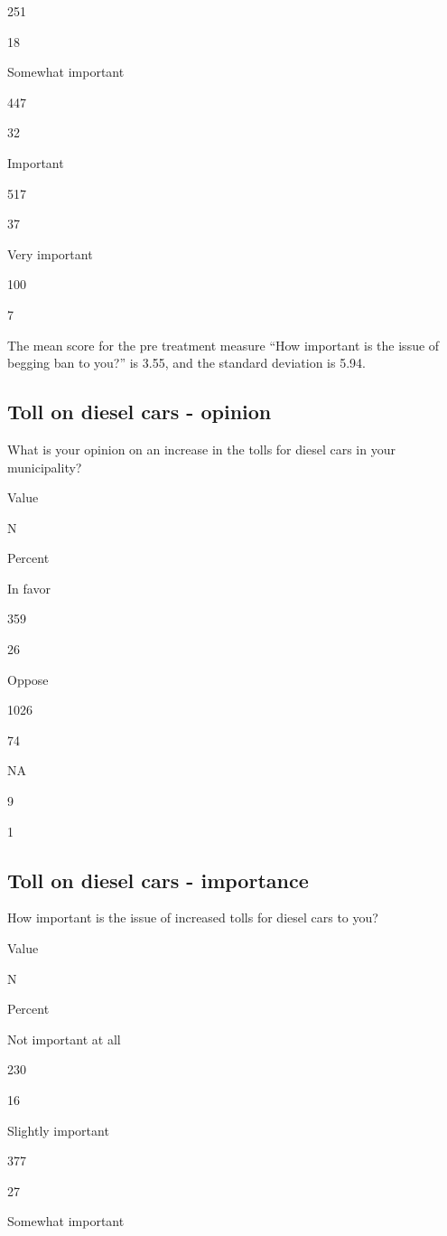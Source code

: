 \documentclass[
]{book}
\begin{document}
251

18

Somewhat important

447

32

Important

517

37

Very important

100

7

The mean score for the pre treatment measure ``How important is the
issue of begging ban to you?'' is 3.55, and the standard deviation is
5.94.

\hypertarget{toll-on-diesel-cars---opinion}{%
\subsection{Toll on diesel cars -
opinion}\label{toll-on-diesel-cars---opinion}}

What is your opinion on an increase in the tolls for diesel cars in your
municipality?

Value

N

Percent

In favor

359

26

Oppose

1026

74

NA

9

1

\hypertarget{toll-on-diesel-cars---importance}{%
\subsection{Toll on diesel cars -
importance}\label{toll-on-diesel-cars---importance}}

How important is the issue of increased tolls for diesel cars to you?

Value

N

Percent

Not important at all

230

16

Slightly important

377

27

Somewhat important
\end{document}
